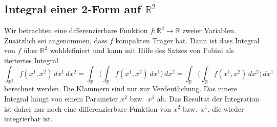 \subsection{Integral einer 2-Form auf $\mathbb{R}^2$}
Wir betrachten eine differenzierbare Funktion
$f\colon \mathbb{R}^2\to\mathbb{R}$ zweier Variablen.
Zusätzlich sei angenommen, dass $f$ kompakten Träger hat. 
Dann ist dass Integral von $f$ über $\mathbb{R}^2$ wohldefiniert
und kann mit Hilfe des Satzes von Fubini als iteriertes Integral
\begin{equation}
\int_{\mathbb{R}^2} f(x^1,x^2)\,dx^1\,dx^2
=
\int_{\mathbb{R}} \biggl(\int_{\mathbb{R}} f(x^1,x^2) \,dx^1\biggr) \,dx^2
=
\int_{\mathbb{R}} \biggl(\int_{\mathbb{R}} f(x^1,x^2) \,dx^2\biggr) \,dx^1
\label{buch:green:flaechenintegral:eqn:int2}
\end{equation}
berechnet werden.
Die Klammern sind nur zur Verdeutlichung.
Das innere Integral hängt von einem Parameter $x^2$ bzw.~$x^1$ ab.
Das Resultat der Integration ist daher nur noch eine differenzierbare
Funktion von $x^2$ bzw.~$x^1$, die wieder integrierbar ist.

